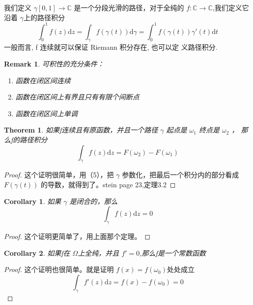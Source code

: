 \documentclass{article}
\newtheorem{theorem}{Theorem}
\newtheorem{remark}{Remark}
\newtheorem{corollary}{Corollary}
\begin{document}
我们定义 $ \gamma \left[ 0,1 \right] \rightarrow \mathbb{C}  $ 是一个分段光滑的路径，对于全纯的 $ f:\mathbb{C}\rightarrow \mathbb{C} $,我们定义它沿着 $ \gamma $上的路径积分
\begin{equation}
    \int_{0}^{1}f(z)\mathrm{d}z=\int_{\gamma}f(\gamma(t))\mathrm{d}\gamma= \int_{0}^{1}f(\gamma(t))\gamma'(t)\mathrm{d}t  
\end{equation}
一般而言, f 连续就可以保证 Riemann 积分存在, 也可以定 义路径积分.
\begin{remark}
    可积性的充分条件：
    \begin{enumerate}
        \item 函数在闭区间连续
        \item 函数在闭区间上有界且只有有限个间断点
        \item 函数在闭区间上单调
    \end{enumerate}

\end{remark}
\begin{theorem}
    如果f连续且有原函数，并且一个路径 $ \gamma $ 起点是 $ \omega_1 $ 终点是 $ \omega_2 $ ， 那么f的路径积分
    \begin{equation}
        \int_{\gamma}^{}f(z)\mathrm{d}z=F(\omega_2)-F(\omega_1)
    \end{equation}
\end{theorem}
\begin{proof}
    这个证明很简单，用（5），把 $ \gamma $ 参数化，把最后一个积分内的部分看成 $ F(\gamma(t)) $ 的导数，就得到了。stein page 23,定理3.2
\end{proof}
\begin{corollary}
    如果 $ \gamma $ 是闭合的，那么
    \begin{equation}
        \int_{\gamma}^{}f(z)\mathrm{d}z=0
    \end{equation}
\end{corollary}
\begin{proof}
    这个证明更简单了，用上面那个定理。
\end{proof}
\begin{corollary}
    如果f在 $ \Omega $上全纯，并且 $ f'= 0$,那么f是一个常数函数
\end{corollary}
\begin{proof}
    这个证明也很简单。就是证明 $ f(x)=f(\omega_0) $处处成立
    \begin{equation*}
        \int_{\gamma}^{}f'(z)\mathrm{d}z=f(x)-f(\omega_0)=0
    \end{equation*}
\end{proof}
\end{document}
